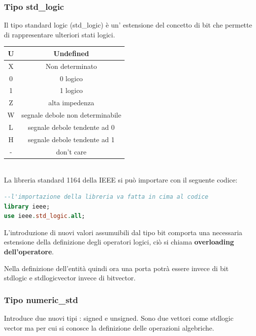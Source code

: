 \documentclass[a4paper]{book}
\begin{document}
\subsubsection{Tipo std\_logic}

Il tipo standard logic (std\_logic) è un' estensione del concetto di bit che permette di rappresentare ulteriori stati logici.\vspace{\baselineskip}\\
\begin{tabular}{|c|c|}
\hline
U & Undefined \\
\hline
X & Non determinato \\
\hline
0 & 0 logico \\
\hline
1 & 1 logico \\
\hline
Z & alta impedenza \\
\hline
W & segnale debole non determinabile \\
\hline
L & segnale debole tendente ad 0 \\
\hline
H & segnale debole tendente ad 1 \\
\hline
- & don't care \\
\hline
\end{tabular}
\vspace{\baselineskip}\\
La libreria standard 1164 della IEEE si può importare con il seguente codice:

\begin{lstlisting}[language= VHDL]
--l'importazione della libreria va fatta in cima al codice
library ieee;
use ieee.std_logic.all;

\end{lstlisting}

L'introduzione di nuovi valori assumuibili dal tipo bit comporta una necessaria estensione della definizione degli operatori logici, ciò si chiama \textbf{overloading dell'operatore}.


Nella definizione dell'entità quindi ora una porta potrà essere invece di bit std\textunderscore logic e std\textunderscore logic\textunderscore vector invece di bit\textunderscore vector.

\subsubsection{Tipo numeric\_std}

Introduce due nuovi tipi : signed e unsigned.
Sono due vettori come std\textunderscore logic \textunderscore vector ma per cui si conosce la definizione delle operazioni algebriche.
\end{document}
